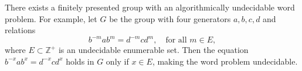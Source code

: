 There exists a finitely presented group with an algorithmically undecidable word problem. For example, let $G$ be the group with four generators $a, b, c, d$ and relations
$$b^{-m}ab^{m} = d^{-m}cd^{m}, \quad \text{for all } m \in E,$$
where $E \subset \mathbb{Z}^+$ is an undecidable enumerable set. Then the equation $b^{-x}ab^{x} = d^{-x}cd^{x}$ holds in $G$ only if $x \in E$, making the word problem undecidable.
